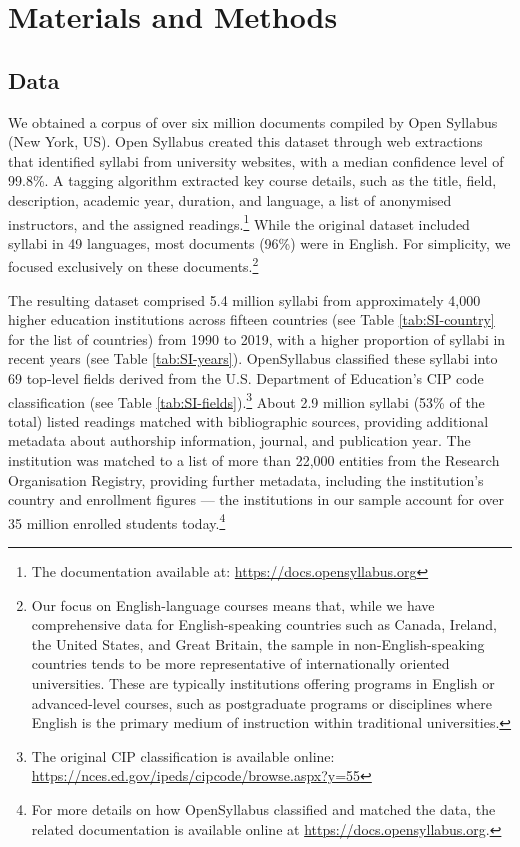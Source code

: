 \documentclass[
  12pt,
]{article}
\let\oldsection\section
\renewcommand{\section}{\clearpage\oldsection}
\begin{document}
\section{Materials and Methods}\label{sec:methods}

\subsection{Data}\label{data}

We obtained a corpus of over six million documents compiled by Open Syllabus (New York, US). Open Syllabus created this dataset through web extractions that identified syllabi from university websites, with a median confidence level of 99.8\%. A tagging algorithm extracted key course details, such as the title, field, description, academic year, duration, and language, a list of anonymised instructors, and the assigned readings.\footnote{The documentation available at: \url{https://docs.opensyllabus.org}} While the original dataset included syllabi in 49 languages, most documents (96\%) were in English. For simplicity, we focused exclusively on these documents.\footnote{Our focus on English-language courses means that, while we have comprehensive data for English-speaking countries such as Canada, Ireland, the United States, and Great Britain, the sample in non-English-speaking countries tends to be more representative of internationally oriented universities. These are typically institutions offering programs in English or advanced-level courses, such as postgraduate programs or disciplines where English is the primary medium of instruction within traditional universities.}

The resulting dataset comprised 5.4 million syllabi from approximately 4,000 higher education institutions across fifteen countries (see Table \ref{tab:SI-country} for the list of countries) from 1990 to 2019, with a higher proportion of syllabi in recent years (see Table \ref{tab:SI-years}). OpenSyllabus classified these syllabi into 69 top-level fields derived from the U.S. Department of Education's CIP code classification (see Table \ref{tab:SI-fields}).\footnote{The original CIP classification is available online: \url{https://nces.ed.gov/ipeds/cipcode/browse.aspx?y=55}} About 2.9 million syllabi (53\% of the total) listed readings matched with bibliographic sources, providing additional metadata about authorship information, journal, and publication year. The institution was matched to a list of more than 22,000 entities from the Research Organisation Registry, providing further metadata, including the institution's country and enrollment figures --- the institutions in our sample account for over 35 million enrolled students today.\footnote{For more details on how OpenSyllabus classified and matched the data, the related documentation is available online at \url{https://docs.opensyllabus.org}.}
\end{document}
